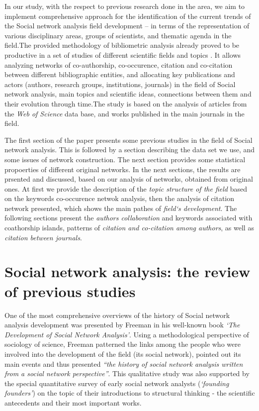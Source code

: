 \documentclass[11pt]{article} %
\begin{document}
In our study, with the respect to previous research done in the area, we aim to implement comprehensive approach for the identification of the current trends of the Social network analysis field development -- in terms of the representation of various disciplinary areas, groups of scientists, and thematic agenda in the field.The provided methodology of bibliometric analysis already proved to be productive in a set of studies of different scientific fields and topics \citep{kejzar,Understand,PeerRew}. It allows analyzing networks of co-authorship, co-occurence, citation and co-citation between different bibliographic entities, and allocating key publications and actors (authors, research groups, institutions, journals) in the field of Social network analysis, main topics and scientific ideas, connections between them and their evolution through time.The study is based on the analysis of articles from the \textit{Web of Science} data base, and works published in the main journals in the field. \medskip 

The first section of the paper presents some previous studies in the field of Social network analysis. This is followed by a section describing the data set we use, and some issues of network construction. The next section provides some statistical propoerties of different original networks. In the next sections, the results are prsented and discussed, based on our analysis of networks, obtained from original ones. At first we provide the description of the \textit{topic structure of the field} based on the keywords co-occurence netwok analysis, then the analysis of citation network presented, which shows the main pathes of \textit{field`s development}. The following sections present the \textit{authors collaboration} and keywords associated with coathorship islands, patterns of \textit{citation and co-citation among authors}, as well as \textit{citation between journals}.\medskip 

\section{Social network analysis: the review of previous studies}

One of the most comprehensive overviews of the history of Social network analysis development was presented by Freeman in his well-known book \textit{`The Development of Social Network Analysis'}\citep{SNAdev}. Using a methodological perspective of sociology of science, Freeman patterned the links  among the people who were involved into the development of the field (its social network),  pointed out its main events and thus presented \textit{“the history of social network analysis written from a social network perspective”}. This qualitative study was also supported by the special quantitative survey of early social network analysts (\textit{`founding founders'}) on the topic of their introductions to structural thinking - the scientific antecedents and their most important works. \medskip 
\end{document}
